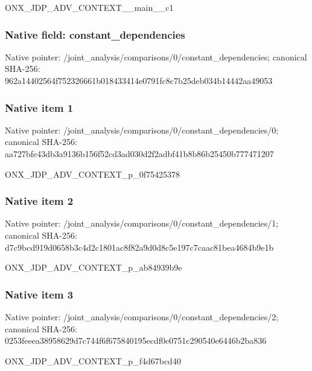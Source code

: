 \documentclass[10pt,a4paper]{article}
\begin{document}
\begingroup\raggedright\sloppy ONX\_\allowbreak{}JDP\_\allowbreak{}ADV\_\allowbreak{}CONTEXT\_\allowbreak{}\_\allowbreak{}main\_\allowbreak{}\_\allowbreak{}c1\par\endgroup

\subsubsection{Native field: constant\_\allowbreak{}dependencies}
Native pointer: /joint\_\allowbreak{}analysis/comparisons/0/constant\_\allowbreak{}dependencies; canonical SHA-256: 962a14402564f752326661b018433414e0791fc8c7b25deb034b14442aa49053

\subsubsection{Native item 1}
Native pointer: /joint\_\allowbreak{}analysis/comparisons/0/constant\_\allowbreak{}dependencies/0; canonical SHA-256: aa727bfe43db3a9136b156f52cd3ad030d2f2adbf41b8b86b25450b777471207

\begingroup\raggedright\sloppy ONX\_\allowbreak{}JDP\_\allowbreak{}ADV\_\allowbreak{}CONTEXT\_\allowbreak{}p\_\allowbreak{}0f75425378\par\endgroup

\subsubsection{Native item 2}
Native pointer: /joint\_\allowbreak{}analysis/comparisons/0/constant\_\allowbreak{}dependencies/1; canonical SHA-256: d7c9bcd919d0658b3c4d2c1801ac8f82a9d0d8c5e197c7caac81bea4684b9e1b

\begingroup\raggedright\sloppy ONX\_\allowbreak{}JDP\_\allowbreak{}ADV\_\allowbreak{}CONTEXT\_\allowbreak{}p\_\allowbreak{}ab84939b9e\par\endgroup

\subsubsection{Native item 3}
Native pointer: /joint\_\allowbreak{}analysis/comparisons/0/constant\_\allowbreak{}dependencies/2; canonical SHA-256: 0253feeea38958629d7c744f6f675840195ecdf0e0751c290540e6446b2ba836

\begingroup\raggedright\sloppy ONX\_\allowbreak{}JDP\_\allowbreak{}ADV\_\allowbreak{}CONTEXT\_\allowbreak{}p\_\allowbreak{}f4d67bcd40\par\endgroup
\end{document}
